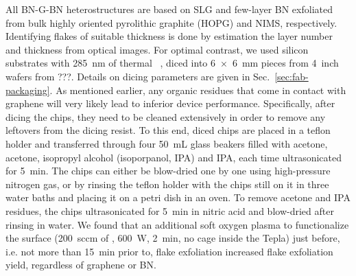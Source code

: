 All BN-G-BN heterostructures are based on SLG and few-layer BN exfoliated from bulk highly oriented pyrolithic graphite (HOPG) and NIMS, respectively.
% 
Identifying flakes of suitable thickness is done by estimation the layer number and thickness from optical images.
% 
For optimal contrast, we used silicon substrates with \SI{285}{\nano\meter} of thermal ~\cite{blakeMakingGrapheneVisible2007}, diced into \SI{6x6}{\milli\meter} pieces from \SI{4}{inch} wafers from ???.
% 
Details on dicing parameters are given in Sec.~\ref{sec:fab-packaging}.
% 
As mentioned earlier, any organic residues that come in contact with graphene will very likely lead to inferior device performance.
% 
Specifically, after dicing the chips, they need to be cleaned extensively in order to remove any leftovers from the dicing resist.
% 
To this end, diced chips are placed in a teflon holder and transferred through four \SI{50}{\milli\liter} glass beakers filled with acetone, acetone, isopropyl alcohol (isoporpanol, IPA) and IPA, each time ultrasonicated for \SI{5}{\minute}.
% 
The chips can either be blow-dried one by one using high-pressure nitrogen gas, or by rinsing the teflon holder with the chips still on it in three water baths and placing it on a petri dish in an oven.
% 
To remove acetone and IPA residues, the chips ultrasonicated for \SI{5}{\minute} in nitric acid and blow-dried after rinsing in water.
% 
We found that an additional soft oxygen plasma to functionalize the  surface (\SI{200}{sccm} of , \SI{600}{\watt}, \SI{2}{\minute}, no cage inside the Tepla) just before, i.e. not more than \SI{15}{\minute} prior to, flake exfoliation increased flake exfoliation yield, regardless of graphene or BN.


